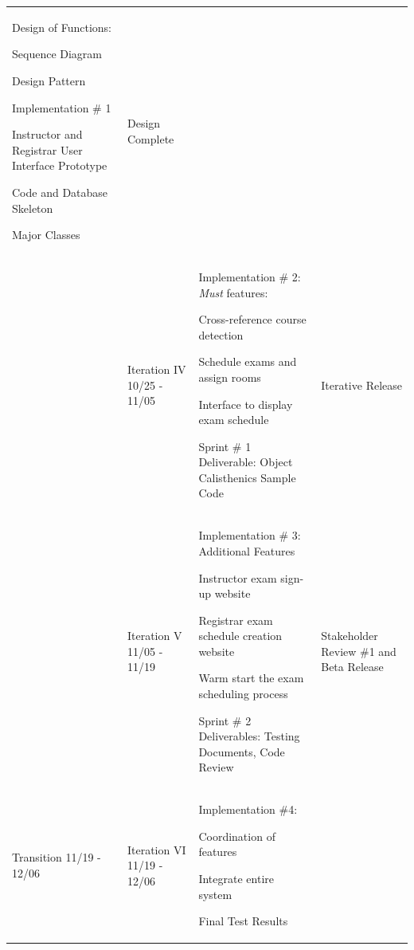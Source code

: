 \documentclass[11pt]{article}
\newenvironment{packed_itemize}{
\begin{itemize}
  \setlength{\itemsep}{1pt}
  \setlength{\parskip}{0pt}
  \setlength{\parsep}{0pt}
}{\end{itemize}}
\begin{document}
\begin{tabular}{|m{0.9in}|m{0.9in}|m{4in}|m{.8in}|}
 Design of Functions:
	\begin{packed_itemize}
		\vspace{-0.15in}
		\item Sequence Diagram
		\item  Design Pattern
	\end{packed_itemize}

 Implementation \# 1
	\begin{packed_itemize}
	\vspace{-0.15in}
	\item Instructor and Registrar User Interface Prototype
		\item Code and Database Skeleton
		\item Major Classes
	\vspace{-0.15in}
	\end{packed_itemize}
 & Design Complete \\  \cline{2-4}
&
 Iteration IV 10/25 - 11/05 & \vspace{0.1in}
 Implementation \# 2:
\emph{Must} features:
	\begin{packed_itemize}
	\vspace{-0.15in}
		\item Cross-reference course detection
		\item Schedule exams and assign rooms
		\item Interface to display exam schedule
	\end{packed_itemize}

{\raggedright
Sprint \# 1 Deliverable:
Object Calisthenics Sample Code }
 & Iterative Release \\  \cline{2-4}
 &
 Iteration V 11/05 - 11/19 & \vspace{0.1in}
 Implementation \# 3: Additional Features
	\begin{packed_itemize}
	\vspace{-0.15in}
		\item Instructor exam sign-up website
		\item Registrar exam schedule creation website
		\item Warm start the exam scheduling process
	\end{packed_itemize}

Sprint \# 2 Deliverables:
 Testing Documents, Code Review &
Stakeholder Review \#1
and
Beta Release \\ \hline
Transition  11/19 - 12/06 &
Iteration VI 11/19 - 12/06 & \vspace{0.1in}
Implementation \#4:
	\begin{packed_itemize}
		\vspace{-0.15in}
		\item Coordination of features
		\item Integrate entire system
	\end{packed_itemize}
Final Test Results


\end{tabular}
\end{document}
